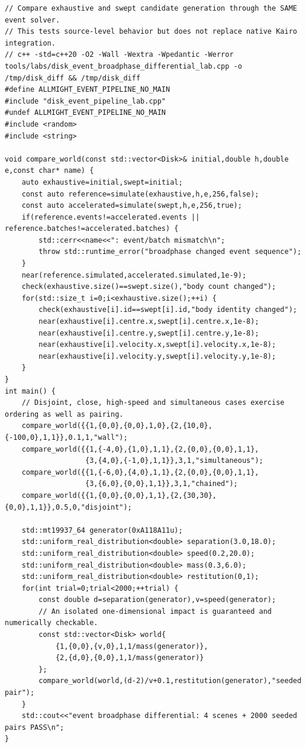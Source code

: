 \begin{verbatim}
// Compare exhaustive and swept candidate generation through the SAME event solver.
// This tests source-level behavior but does not replace native Kairo integration.
// c++ -std=c++20 -O2 -Wall -Wextra -Wpedantic -Werror tools/labs/disk_event_broadphase_differential_lab.cpp -o /tmp/disk_diff && /tmp/disk_diff
#define ALLMIGHT_EVENT_PIPELINE_NO_MAIN
#include "disk_event_pipeline_lab.cpp"
#undef ALLMIGHT_EVENT_PIPELINE_NO_MAIN
#include <random>
#include <string>

void compare_world(const std::vector<Disk>& initial,double h,double e,const char* name) {
    auto exhaustive=initial,swept=initial;
    const auto reference=simulate(exhaustive,h,e,256,false);
    const auto accelerated=simulate(swept,h,e,256,true);
    if(reference.events!=accelerated.events || reference.batches!=accelerated.batches) {
        std::cerr<<name<<": event/batch mismatch\n";
        throw std::runtime_error("broadphase changed event sequence");
    }
    near(reference.simulated,accelerated.simulated,1e-9);
    check(exhaustive.size()==swept.size(),"body count changed");
    for(std::size_t i=0;i<exhaustive.size();++i) {
        check(exhaustive[i].id==swept[i].id,"body identity changed");
        near(exhaustive[i].centre.x,swept[i].centre.x,1e-8);
        near(exhaustive[i].centre.y,swept[i].centre.y,1e-8);
        near(exhaustive[i].velocity.x,swept[i].velocity.x,1e-8);
        near(exhaustive[i].velocity.y,swept[i].velocity.y,1e-8);
    }
}
int main() {
    // Disjoint, close, high-speed and simultaneous cases exercise ordering as well as pairing.
    compare_world({{1,{0,0},{0,0},1,0},{2,{10,0},{-100,0},1,1}},0.1,1,"wall");
    compare_world({{1,{-4,0},{1,0},1,1},{2,{0,0},{0,0},1,1},
                   {3,{4,0},{-1,0},1,1}},3,1,"simultaneous");
    compare_world({{1,{-6,0},{4,0},1,1},{2,{0,0},{0,0},1,1},
                   {3,{6,0},{0,0},1,1}},3,1,"chained");
    compare_world({{1,{0,0},{0,0},1,1},{2,{30,30},{0,0},1,1}},0.5,0,"disjoint");

    std::mt19937_64 generator(0xA118A11u);
    std::uniform_real_distribution<double> separation(3.0,18.0);
    std::uniform_real_distribution<double> speed(0.2,20.0);
    std::uniform_real_distribution<double> mass(0.3,6.0);
    std::uniform_real_distribution<double> restitution(0,1);
    for(int trial=0;trial<2000;++trial) {
        const double d=separation(generator),v=speed(generator);
        // An isolated one-dimensional impact is guaranteed and numerically checkable.
        const std::vector<Disk> world{
            {1,{0,0},{v,0},1,1/mass(generator)},
            {2,{d,0},{0,0},1,1/mass(generator)}
        };
        compare_world(world,(d-2)/v+0.1,restitution(generator),"seeded pair");
    }
    std::cout<<"event broadphase differential: 4 scenes + 2000 seeded pairs PASS\n";
}
\end{verbatim}

